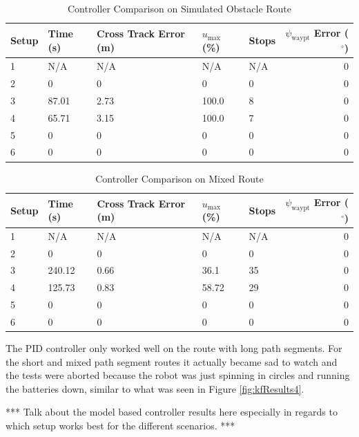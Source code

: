 \begin{table}[ht!]
\caption{Controller Comparison on Simulated Obstacle Route}
\small
\centering
\begin{tabular}{@{}lllllr@{}} \toprule
Setup & Time (s) & Cross Track Error (m) & $u_{\text{max}}$ (\%) & Stops & $\psi_{\text{waypt}}$ Error ($\left.^\circ\right.$) \\ \midrule
1     & N/A      & N/A                   & N/A                   & N/A   & 0 \\
2     & 0        & 0                     & 0                     & 0     & 0 \\
3     & 87.01    & 2.73                  & 100.0                 & 8     & 0 \\
4     & 65.71    & 3.15                  & 100.0                 & 7     & 0 \\
5     & 0        & 0                     & 0                     & 0     & 0 \\
6     & 0        & 0                     & 0                     & 0     & 0 \\ \bottomrule
\end{tabular}
\label{tab:resultsControllersObstacles}
\end{table}

\begin{table}[ht!]
\caption{Controller Comparison on Mixed Route}
\small
\centering
\begin{tabular}{@{}lllllr@{}} \toprule
Setup & Time (s) & Cross Track Error (m) & $u_{\text{max}}$ (\%) & Stops & $\psi_{\text{waypt}}$ Error ($\left.^\circ\right.$) \\ \midrule
1     & N/A      & N/A                   & N/A                   & N/A   & 0 \\
2     & 0        & 0                     & 0                     & 0     & 0 \\
3     & 240.12   & 0.66                  & 36.1                  & 35    & 0 \\
4     & 125.73   & 0.83                  & 58.72                 & 29    & 0 \\
5     & 0        & 0                     & 0                     & 0     & 0 \\
6     & 0        & 0                     & 0                     & 0     & 0 \\ \bottomrule
\end{tabular}
\label{tab:resultsControllersMixed}
\end{table}

The PID controller only worked well on the route with long path segments. For the short and mixed path segment routes it actually became sad to watch and the tests were aborted because the robot was just spinning in circles and running the batteries down, similar to what was seen in Figure \ref{fig:kfResults4}.

*** Talk about the model based controller results here especially in regards to which setup works best for the different scenarios. ***
